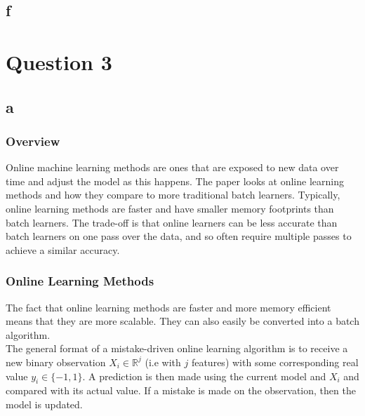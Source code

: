\documentclass{article}
\begin{document}
\subsection*{f}

\newpage
\section*{Question 3}

\subsection*{a}

\subsubsection*{Overview}


Online machine learning methods are ones that are exposed to new data over time and adjust the model as this happens.
The paper looks at online learning methods and how they compare to more traditional batch learners. Typically, online
learning methods are faster and have smaller memory footprints than batch learners. The trade-off is that online
learners can be less accurate than batch learners on one pass over the data, and so often require multiple passes to achieve a similar 
accuracy.\\


\subsubsection*{Online Learning Methods}

The fact that online learning methods are faster and more memory efficient means that they are more scalable. They can also
easily be converted into a batch algorithm.\\

The general format of a mistake-driven online learning algorithm is to receive a new binary observation \(X_{i} \in \mathbb{R}^{j}\) (i.e with \(j\) features) 
with some corresponding real value \(y_{i} \in \{-1,1\}\). A prediction is then made using the current model and \(X_{i}\) and compared with its actual 
value. If a mistake is made on the observation, then the model is updated.\\
\end{document}
